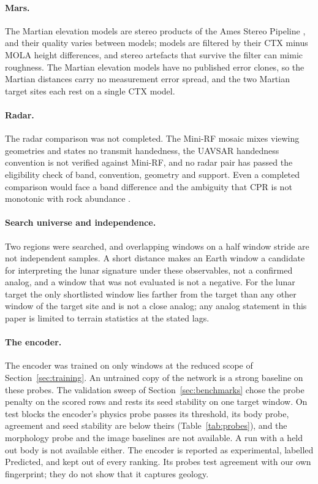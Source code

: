 \paragraph{Mars.} The Martian elevation models are stereo products of the Ames Stereo Pipeline \citep{beyer2018}, and their quality varies between models; models are filtered by their CTX minus MOLA height differences, and stereo
artefacts that survive the filter can mimic roughness. The Martian elevation models have no published error clones, so the Martian distances carry no measurement error spread, and the two Martian target sites each rest on a single CTX model.

\paragraph{Radar.} The radar comparison was not completed. The Mini-RF mosaic mixes viewing
geometries and states no transmit handedness, the UAVSAR handedness convention is not verified
against Mini-RF, and no radar pair has passed the eligibility check of band, convention, geometry and support. Even a completed comparison would face a band difference and the
ambiguity that CPR is not monotonic with rock abundance \citep{riveravalentin2026}.

\paragraph{Search universe and independence.} Two regions were searched, and overlapping windows
on a half window stride are not independent samples. A short distance makes an Earth window a
candidate for interpreting the lunar signature under these observables, not a confirmed analog,
and a window that was not evaluated is not a negative. For the lunar target the only shortlisted
window lies farther from the target than any other window of the target site and is not a close
analog; any analog statement in this paper is limited to terrain statistics at the stated lags.

\paragraph{The encoder.} The encoder was trained on only \DatasetWindows{} windows at the reduced
scope of Section~\ref{sec:training}. An
untrained copy of the network is a strong baseline on these probes. The validation sweep of
Section~\ref{sec:benchmarks} chose the probe penalty on the scored rows and rests its seed
stability on one target window. On test blocks the encoder's physics probe passes its threshold, its body probe, agreement and seed
stability are below theirs (Table~\ref{tab:probes}), and the morphology probe and the image baselines are not available. A run with a
held out body is not available either. The
encoder is reported as experimental, labelled Predicted, and kept out of every ranking. Its probes
test agreement with our own fingerprint; they do not show that it captures geology.
